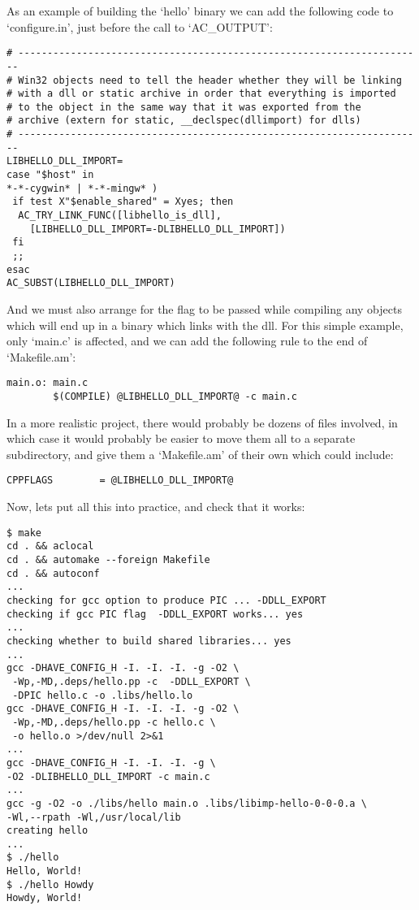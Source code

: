 As an example of building the `hello' binary we can add the following code to `configure.in', just before the call to `AC\_{}OUTPUT':

\begin{verbatim}
# ----------------------------------------------------------------------
# Win32 objects need to tell the header whether they will be linking
# with a dll or static archive in order that everything is imported
# to the object in the same way that it was exported from the
# archive (extern for static, __declspec(dllimport) for dlls)
# ----------------------------------------------------------------------
LIBHELLO_DLL_IMPORT=
case "$host" in
*-*-cygwin* | *-*-mingw* )
 if test X"$enable_shared" = Xyes; then
  AC_TRY_LINK_FUNC([libhello_is_dll],
    [LIBHELLO_DLL_IMPORT=-DLIBHELLO_DLL_IMPORT])
 fi
 ;;
esac
AC_SUBST(LIBHELLO_DLL_IMPORT)
\end{verbatim}

And we must also arrange for the flag to be passed while compiling any objects which will end up in a binary which links with the dll. For this simple example, only `main.c' is affected, and we can add the following rule to the end of `Makefile.am':

\begin{verbatim}
main.o: main.c
        $(COMPILE) @LIBHELLO_DLL_IMPORT@ -c main.c
\end{verbatim}

In a more realistic project, there would probably be dozens of files involved, in which case it would probably be easier to move them all to a separate subdirectory, and give them a `Makefile.am' of their own which could include:

\begin{verbatim}
CPPFLAGS        = @LIBHELLO_DLL_IMPORT@
\end{verbatim}

Now, lets put all this into practice, and check that it works:

\begin{Verbatim}[frame=single]
$ make
cd . && aclocal
cd . && automake --foreign Makefile
cd . && autoconf
...
checking for gcc option to produce PIC ... -DDLL_EXPORT
checking if gcc PIC flag  -DDLL_EXPORT works... yes
...
checking whether to build shared libraries... yes
...
gcc -DHAVE_CONFIG_H -I. -I. -I. -g -O2 \
 -Wp,-MD,.deps/hello.pp -c  -DDLL_EXPORT \
 -DPIC hello.c -o .libs/hello.lo
gcc -DHAVE_CONFIG_H -I. -I. -I. -g -O2 \
 -Wp,-MD,.deps/hello.pp -c hello.c \
 -o hello.o >/dev/null 2>&1
...
gcc -DHAVE_CONFIG_H -I. -I. -I. -g \
-O2 -DLIBHELLO_DLL_IMPORT -c main.c
...
gcc -g -O2 -o ./libs/hello main.o .libs/libimp-hello-0-0-0.a \
-Wl,--rpath -Wl,/usr/local/lib
creating hello
...
$ ./hello
Hello, World!
$ ./hello Howdy
Howdy, World!
\end{Verbatim}

